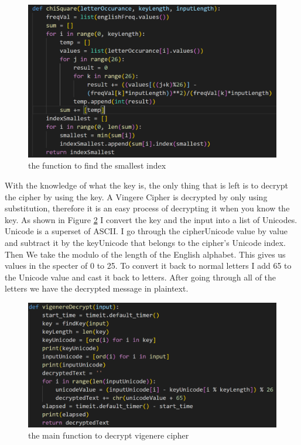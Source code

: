 \documentclass[12pt, letterpaper]{article}
\begin{document}
\begin{figure}[H]
  \includegraphics[width=\linewidth]{code_snippets/chiSquare.PNG}
  \caption{the function to find the smallest index}
  \label{fig:chiSquare}
\end{figure}

With the knowledge of what the key is, the only thing that is left is to decrypt the cipher by using the key. A Vingere Cipher is decrypted by only using substitution, therefore it is an easy process of decrypting it when you know the key. As shown in Figure \ref{fig:vigenereDecrypt} I convert the key and the input into a list of Unicodes. Unicode is a superset of ASCII. I go through the cipherUnicode value by value and subtract it by the keyUnicode that belongs to the cipher's Unicode index. Then We take the modulo of the length of the English alphabet. This gives us values in the specter of 0 to 25. To convert it back to normal letters I add 65 to the Unicode value and cast it back to letters. After going through all of the letters we have the decrypted message in plaintext.

\begin{figure}[H]
  \includegraphics[width=\linewidth]{code_snippets/vigenereDecrypt.PNG}
  \caption{the main function to decrypt vigenere cipher}
  \label{fig:vigenereDecrypt}
\end{figure} 
\end{document}
